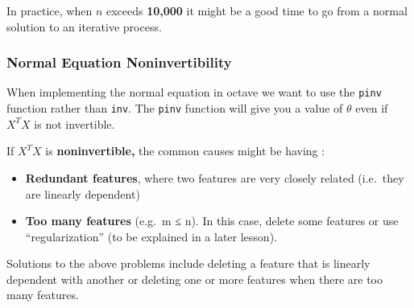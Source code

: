 \documentclass[11pt]{article}
\providecommand{\tightlist}{%
      \setlength{\itemsep}{0pt}\setlength{\parskip}{0pt}}
\begin{document}
In practice, when \(n\) exceeds \textbf{10,000} it might be a good time
to go from a normal solution to an iterative process.

\hypertarget{normal-equation-noninvertibility}{%
\subsubsection{Normal Equation
Noninvertibility}\label{normal-equation-noninvertibility}}

When implementing the normal equation in octave we want to use the
\texttt{pinv} function rather than \texttt{inv}. The \texttt{pinv}
function will give you a value of \(\theta\) even if \(X^TX\) is not
invertible.

If \(X^TX\) is \textbf{noninvertible,} the common causes might be having
:

\begin{itemize}
\tightlist
\item
  \textbf{Redundant features}, where two features are very closely
  related (i.e.~they are linearly dependent)
\item
  \textbf{Too many features} (e.g.~m ≤ n). In this case, delete some
  features or use ``regularization'' (to be explained in a later
  lesson).
\end{itemize}

Solutions to the above problems include deleting a feature that is
linearly dependent with another or deleting one or more features when
there are too many features.


    
    
    
    
\end{document}

